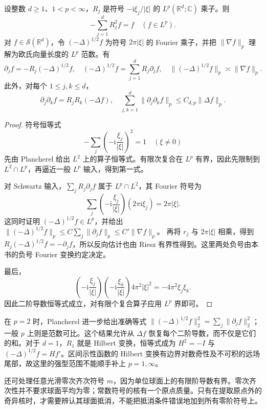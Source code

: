 \begin{proposition}\label{b2:prop:22-riesz-gradient}
设整数 \(d\geq1\)、\(1<p<\infty\)，\(R_j\) 是符号 \(-\mathrm i\xi_j/|\xi|\) 的 \(L^p(\mathbb R^d;\mathbb C)\) 乘子。则
\[
 -\sum_{j=1}^dR_j^2f=f\quad(f\in L^p).
\]
对 \(f\in\mathcal S(\mathbb R^d)\)，令 \((-\Delta)^{1/2}f\) 为符号 \(2\pi|\xi|\) 的 Fourier 乘子，并把 \(\|\nabla f\|_p\) 理解为欧氏向量长度的 \(L^p\) 范数。有
\[
 \partial_jf=-R_j(-\Delta)^{1/2}f,\quad
 (-\Delta)^{1/2}f=\sum_{j=1}^dR_j\partial_jf,\quad
 \|(-\Delta)^{1/2}f\|_p\asymp\|\nabla f\|_p.
\]
此外，对每个 \(1\leq j,k\leq d\)，
\[
 \partial_j\partial_k f=R_jR_k(-\Delta f),
 \quad
 \sum_{j,k=1}^d\|\partial_j\partial_k f\|_p
 \leq C_{d,p}\|\Delta f\|_p.
\]
\end{proposition}
\begin{proof}
符号恒等式
\[
 -\sum_j\left(-\mathrm i\frac{\xi_j}{|\xi|}\right)^2=1
 \quad(\xi\ne0)
\]
先由 Plancherel 给出 \(L^2\) 上的算子恒等式。有限次复合在 \(L^p\) 有界，因此先限制到 \(L^2\cap L^p\)，再逼近一般 \(L^p\) 输入，得到第一式。

对 Schwartz 输入，\(\sum_jR_j\partial_jf\) 属于 \(L^p\cap L^2\)，其 Fourier 符号为
\[
 \sum_j\left(-\mathrm i\frac{\xi_j}{|\xi|}\right)
                (2\pi\mathrm i\xi_j)=2\pi|\xi|.
\]
这同时证明 \((-\Delta)^{1/2}f\in L^p\)，并给出
\(\|(-\Delta)^{1/2}f\|_p\leq C\sum_j\|\partial_jf\|_p\leq C'\|\nabla f\|_p\)。
再将 \(r_j\) 与 \(2\pi|\xi|\) 相乘，得到
\(R_j(-\Delta)^{1/2}f=-\partial_jf\)，所以反向估计也由 Riesz 有界性得到。这里两处负号由本书的负号 Fourier 变换约定决定。

最后，
\[
 \left(-\mathrm i\frac{\xi_j}{|\xi|}\right)
 \left(-\mathrm i\frac{\xi_k}{|\xi|}\right)
       4\pi^2|\xi|^2=-4\pi^2\xi_j\xi_k.
\]
因此二阶导数恒等式成立，对有限个复合算子应用 \(L^p\) 界即可。
\end{proof}
在 \(p=2\) 时，Plancherel 进一步给出准确等式
\(\|(-\Delta)^{1/2}f\|_2^2=\sum_j\|\partial_jf\|_2^2\)；一般 \(p\) 上则是范数可比。这个结果允许从 \(\Delta f\) 恢复每个二阶导数，而不仅是它们的和。对于 \(d=1\)，\(R_1\) 就是 Hilbert 变换，恒等式成为 \(H^2=-I\) 与 \((-\Delta)^{1/2}f=Hf'\)。区间示性函数的 Hilbert 变换有边界对数奇性及不可积的远场尾部，故这里的强型范围不能顺手补上 \(p=1,\infty\)。

\ProseParagraphBreak
还可处理任意光滑零次齐次符号 \(m\)，因为单位球面上的有限阶导数有界。零次齐次性并不要求球面平均为零；常数符号的核有一个原点质量。只有在提取原点外的奇异核时，才需要辨认其球面抵消，不能把抵消条件错误地加到所有零阶符号上。

